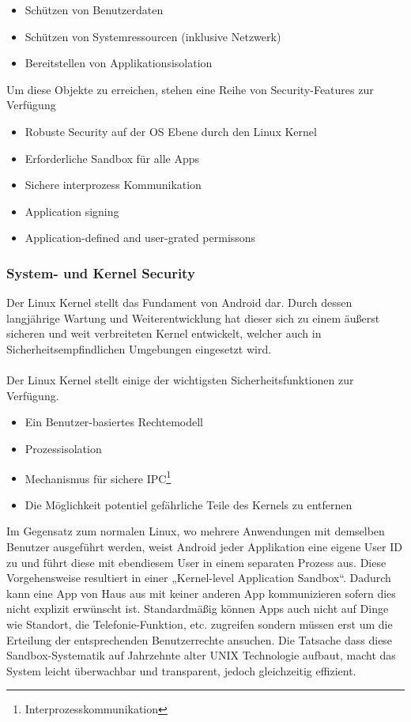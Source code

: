 \begin{itemize}
	\item Schützen von Benutzerdaten
	\item Schützen von Systemressourcen (inklusive Netzwerk)
	\item Bereitstellen von Applikationsisolation
\end{itemize}
Um diese Objekte zu erreichen, stehen eine Reihe von Security-Features zur Verfügung
\begin{itemize}
	\item Robuste Security auf der OS Ebene durch den Linux Kernel
	\item Erforderliche Sandbox für alle Apps
	\item Sichere interprozess Kommunikation
	\item Application signing
	\item Application-defined and user-grated permissons
\end{itemize}

\subsubsection{System- und Kernel Security}
Der Linux Kernel stellt das Fundament von Android dar. Durch dessen langjährige Wartung und Weiterentwicklung hat dieser sich zu einem äußerst sicheren und weit verbreiteten Kernel entwickelt, welcher auch in Sicherheitsempfindlichen Umgebungen eingesetzt wird.
\paragraph*{}
Der Linux Kernel stellt einige der wichtigsten Sicherheitsfunktionen zur Verfügung.
\begin{itemize}
	\item Ein Benutzer-basiertes Rechtemodell
	\item Prozessisolation
	\item Mechanismus für sichere IPC\footnote{Interprozesskommunikation} 
	\item Die Möglichkeit potentiel gefährliche Teile des Kernels zu entfernen
\end{itemize}
Im Gegensatz zum normalen Linux, wo mehrere Anwendungen mit demselben Benutzer ausgeführt werden, weist Android jeder Applikation eine eigene User ID zu und führt diese mit ebendiesem User in einem separaten Prozess aus.
Diese Vorgehensweise resultiert in einer „Kernel-level Application Sandbox“. Dadurch kann eine App von Haus aus mit keiner anderen App kommunizieren sofern dies nicht explizit erwünscht ist. Standardmäßig können Apps auch nicht auf Dinge wie Standort, die Telefonie-Funktion, etc. zugreifen sondern müssen erst um die Erteilung der entsprechenden Benutzerrechte ansuchen. Die Tatsache dass diese Sandbox-Systematik auf Jahrzehnte alter UNIX Technologie aufbaut, macht das System leicht überwachbar und transparent, jedoch gleichzeitig effizient.
